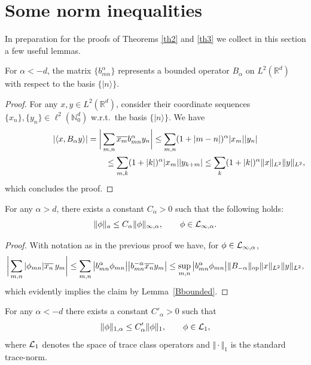 \section{Some norm inequalities}
\label{secframe}

In preparation for the proofs of Theorems \ref{th2} and \ref{th3} we
collect in this section a few useful lemmas.

\begin{lemma}
\label{Bbounded}
For $\alpha<-d$, the matrix
$\{b_{mn}^\alpha\}$ represents a bounded operator $B_\alpha$ on
$L^2(\mathbb R^d)$ with respect to the basis $\{|n\rangle\}$.
\end{lemma}
\begin{proof}
For any $x,y\in L^2(\mathbb R^d)$, consider their coordinate sequences
$\{x_n\},\{y_n\}\in \ell^2(\mathbb N_0^d)$ w.r.t.\ the basis $\{|n\rangle\}$. We have
\begin{gather*}
\vert\langle x,B_\alpha y\rangle\vert=
\bigg|\sum_{m,n}\overline{x_m} b^\alpha_{mn} y_n\bigg| \leq
\sum_{m,n}(1+|m-n|)^\alpha |x_m| |y_n|\\
\hphantom{\vert\langle x,B_\alpha y\rangle\vert=
\bigg|\sum_{m,n}\overline{x_m} b^\alpha_{mn} y_n\bigg|}{}
\leq\sum_{m,k}(1+|k|)^\alpha |x_m| |y_{k+m}|
\leq\sum_k(1+|k|)^\alpha \Vert x\Vert_{L^2} \Vert y\Vert_{L^2} ,
\end{gather*}
which concludes the proof.
\end{proof}

\begin{lemma}\label{anorm}
For any $\alpha>d$, there exists a constant $C_\alpha>0$ such that the following holds:
\[
\Vert\phi\Vert_a\leq C_\alpha \Vert\phi\Vert_{\infty,\alpha} ,\qquad \phi\in{\cal L}_{\infty,\alpha} .
\]
\end{lemma}

\begin{proof}
With notation as in the previous proof we have, for $\phi\in{\cal L}_{\infty,\alpha}$,
\begin{gather*}
\bigg|\sum_{m,n}|\phi_{mn}| \overline{x_n}\,y_m\bigg| \leq
\sum_{m,n}\big|b^\alpha_{mn} \phi_{mn}\big|
\big|b^{-\alpha}_{mn} \overline{x_n} y_m\big|
\leq \sup_{m,n}\big|b^\alpha_{mn}\phi_{mn}\big|
 \Vert B_{-\alpha}\Vert_{\rm op} \Vert x\Vert_{L^2} \Vert y\Vert_{L^2} ,
\end{gather*}
which evidently implies the claim by Lemma~\ref{Bbounded}.
\end{proof}

\begin{lemma}\label{trace}
For any $\alpha<-d$ there exists a constant $C'_\alpha>0$ such that
\[
\Vert\phi\Vert_{1,\alpha}\leq C'_{\alpha} \Vert\phi\Vert_1 ,\qquad \phi\in{\cal L}_1 ,
\]
where ${\cal L}_1$ denotes the space of trace class operators and
$\Vert\cdot\Vert_1$ is the standard trace-norm.
\end{lemma}

